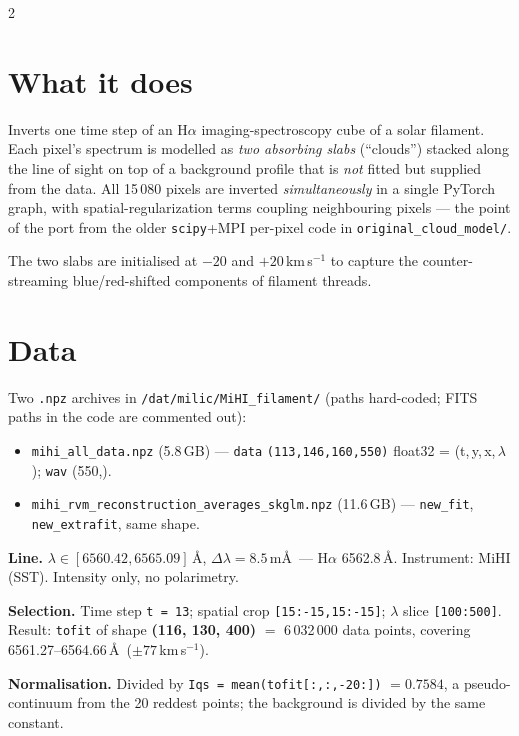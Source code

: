 \documentclass[9pt,a4paper]{article}
\newcommand{\co}[1]{{\small\texttt{#1}}}
\begin{document}
\begin{multicols}{2}

\section{What it does}

Inverts one time step of an H$\alpha$ imaging-spectroscopy cube of a solar filament. Each pixel's spectrum is modelled as \emph{two absorbing slabs} (``clouds'') stacked along the line of sight on top of a background profile that is \emph{not} fitted but supplied from the data. All 15\,080 pixels are inverted \emph{simultaneously} in a single PyTorch graph, with spatial-regularization terms coupling neighbouring pixels --- the point of the port from the older \co{scipy}+MPI per-pixel code in \co{original\_cloud\_model/}.

The two slabs are initialised at $-20$ and $+20$\,km\,s$^{-1}$ to capture the counter-streaming blue/red-shifted components of filament threads.

\section{Data}

Two \co{.npz} archives in \co{/dat/milic/MiHI\_filament/} (paths hard-coded; FITS paths in the code are commented out):

\begin{itemize}
\item \co{mihi\_all\_data.npz} (5.8\,GB) --- \co{data} \co{(113,146,160,550)} float32 = (t,\,y,\,x,\,$\lambda$); \co{wav} (550,).
\item \co{mihi\_rvm\_reconstruction\_\allowbreak averages\_skglm.npz} (11.6\,GB) --- \co{new\_fit}, \co{new\_extrafit}, same shape.
\end{itemize}

\textbf{Line.} $\lambda\in[6560.42,6565.09]$\,\AA, $\Delta\lambda=8.5$\,m\AA\ --- H$\alpha$ 6562.8\,\AA. Instrument: MiHI (SST). Intensity only, no polarimetry.

\textbf{Selection.} Time step \co{t\,=\,13}; spatial crop \co{[15:-15,15:-15]}; $\lambda$ slice \co{[100:500]}. Result: \co{tofit} of shape \textbf{(116, 130, 400)} $=$ 6\,032\,000 data points, covering 6561.27--6564.66\,\AA\ ($\pm77$\,km\,s$^{-1}$).

\textbf{Normalisation.} Divided by \co{Iqs\,=\,mean(tofit[:,:,-20:])} $=0.7584$, a pseudo-continuum from the 20 reddest points; the background is divided by the same constant.


\end{multicols}
\end{document}

